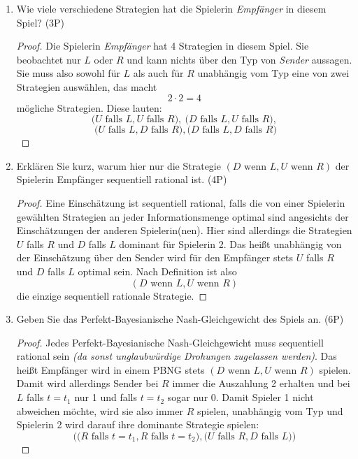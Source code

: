 \documentclass[12pt]{article}
\begin{document}
\begin{enumerate}[label=\alph*\upshape)]
	\item Wie viele verschiedene Strategien hat die Spielerin \textit{Empfänger} in diesem Spiel? (3P)
		\begin{proof}
			Die Spielerin \textit{Empfänger} hat 4 Strategien in diesem Spiel. Sie beobachtet nur $L$ oder $R$ und kann nichts über den Typ von \textit{Sender} aussagen. Sie muss also sowohl für $L$ als auch für $R$ unabhängig vom Typ eine von zwei Strategien auswählen, das macht
			$$ 2 \cdot 2 = 4 $$
			mögliche Strategien. Diese lauten:
			$$ \big( U \text{ falls } L, U \text{ falls } R \big), ~ \big( D \text{ falls } L, U \text{ falls } R \big), $$
			$$ ~ \big( U \text{ falls } L, D \text{ falls } R \big), \big( D \text{ falls } L, D \text{ falls } R \big) $$
		\end{proof}
	\item Erklären Sie kurz, warum hier nur die Strategie $(D \text{ wenn } L, U \text{ wenn } R)$ der Spielerin Empfänger sequentiell rational ist. (4P)
		\begin{proof}
			Eine Einschätzung ist sequentiell rational, falls die von einer Spielerin gewählten Strategien an jeder Informationsmenge optimal sind angesichts der Einschätzungen der anderen Spielerin(nen). Hier sind allerdings die Strategien $U$ falls $R$ und $D$ falls $L$ dominant für Spielerin 2. Das heißt unabhängig von der Einschätzung über den Sender wird für den Empfänger stets $U$ falls $R$ und $D$ falls $L$ optimal sein. Nach Definition ist also 
			$$(D \text{ wenn } L, U \text{ wenn } R)$$
			die einzige sequentiell rationale Strategie.
		\end{proof}
	\item Geben Sie das Perfekt-Bayesianische Nash-Gleichgewicht des Spiels an. (6P)
		\begin{proof}
			Jedes Perfekt-Bayesianische Nash-Gleichgewicht muss sequentiell rational sein \textit{(da sonst unglaubwürdige Drohungen zugelassen werden)}. Das heißt Empfänger wird in einem PBNG stets $(D \text{ wenn } L, U \text{ wenn } R)$ spielen. Damit wird allerdings Sender bei $R$ immer die Auszahlung 2 erhalten und bei $L$ falls $t = t_1$ nur 1 und falls $t = t_2$ sogar nur 0. Damit Spieler 1 nicht abweichen möchte, wird sie also immer $R$ spielen, unabhängig vom Typ und Spielerin 2 wird darauf ihre dominante Strategie spielen:
			$$ \Big( \big(R \text{ falls } t = t_1, R \text{ falls } t = t_2 \big), \big( U \text{ falls } R, D \text{ falls } L \big) \Big) $$
		\end{proof}

\end{enumerate}
\end{document}
